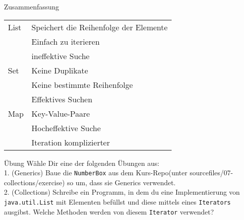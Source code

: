 \begin{frame}{Zusammenfassung}
    \begin{center}
        \begin{tabular}{ l | l }
            List & Speichert die Reihenfolge der Elemente \\
                 & Einfach zu iterieren \\
                 & ineffektive Suche\\
            \hline
            Set  & Keine Duplikate \\
                 & Keine bestimmte Reihenfolge \\
                 & Effektives Suchen \\
            \hline
            Map  & Key-Value-Paare \\
                 & Hocheffektive Suche \\
                 & Iteration komplizierter
        \end{tabular}
    \end{center}
\end{frame}

\begin{frame}{Übung}
    \center
    \large{Wähle Dir eine der folgenden Übungen aus: \\
    \vfill
    1. (Generics) Baue die \texttt{NumberBox} aus dem Kurs-Repo(unter sourcefiles/07-collections/exercise) so um, dass sie Generics verwendet. \\
    \vfill
    2. (Collections) Schreibe ein Programm, in dem du eine Implementierung von \texttt{java.util.List} mit Elementen befüllst und diese mittels eines \texttt{Iterators} ausgibst. Welche Methoden werden von diesem \texttt{Iterator} verwendet?}
\end{frame}

